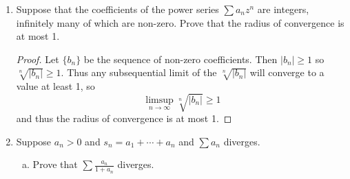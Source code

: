 \begin{enumerate}
\begin{enumerate}[(a)]
\begin{proof}
In order for $\sum n^3z^n$ to converge, we must have
\[
	\limsup_{n \to \infty} \left|\frac{n^3z^n}{(n-1)^3z^{n-1}}\right| = |z| < 1
\]
so the radius of convergence is 1.
\end{proof}
\item $\sum \frac{2^n}{n!}z^n$.
\begin{proof}
Using the ratio test, we must have
\[
	\limsup_{n \to \infty} \left|\frac{2^n (n-1)! z^n}{2^{n-1} n! z^{n-1}} \right| = \limsup_{n \to \infty} \frac{2}{n}|z| = 0 < 1
\]
which holds regardless of $z$, so the radius of convergence is $+\infty$.
\end{proof}
\item $\sum \frac{2^n}{n^2} z^n$.
\begin{proof}
Using the ratio test, we must have
\[
	\limsup_{n \to \infty} \left|\frac{2^n (n-1)^2 z^n}{2^{n-1} n^2 z^{n-1}} \right| = \limsup_{n \to \infty} 2 \left|\frac{(n-1)^2}{n^2} \right| |z| = 2|z| < 1
\]
so the radius of convergence is $1/2$.
\end{proof}
\item $\sum \frac{n^3}{3^n} z^n$.

\begin{proof}
By the ratio test, we must have
\[
	\limsup_{n \to \infty} \left|\frac{n^3 3^{n-1} z^n}{(n-1)^3 3^n z^{n-1}} \right| = \limsup_{n \to \infty} \frac{1}{3} \left|\frac{n^3}{(n-1)^3} \right| |z| = \frac{1}{3} |z| < 1
\]
so the radius of convergence is 3.
\end{proof}
\end{enumerate}

\item %
Suppose that the coefficients of the power series $\sum a_nz^n$ are integers, infinitely many of which are non-zero. Prove that the radius of convergence is at most 1.

\begin{proof}
Let $\{b_n\}$ be the sequence of non-zero coefficients. Then $|b_n| \ge 1$ so $\sqrt[n]{|b_n|} \ge 1$. Thus any subsequential limit of the $\sqrt[n]{|b_n|}$ will converge to a value at least 1, so
\[
	\limsup_{n \to \infty} \sqrt[n]{|b_n|} \ge 1
\]
and thus the radius of convergence is at most 1.
\end{proof}

\item %
Suppose $a_n > 0$ and $s_n = a_1 + \dotsb + a_n$ and $\sum a_n$ diverges.
\begin{enumerate}[(a)]
\item Prove that $\sum \frac{a_n}{1 + a_n}$ diverges.


\end{enumerate}
\end{enumerate}
